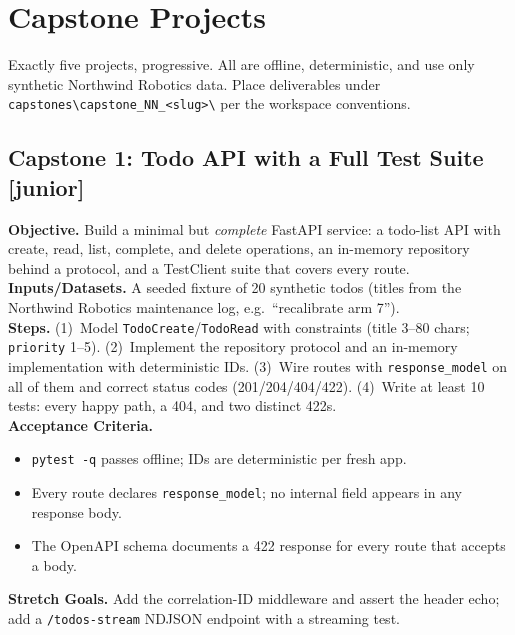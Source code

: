 \section{Capstone Projects}
\label{sec:ch6-capstones}

Exactly five projects, progressive. All are offline, deterministic, and use
only synthetic Northwind Robotics data. Place deliverables under
\texttt{capstones\textbackslash{}capstone\_NN\_<slug>\textbackslash{}} per the
workspace conventions.

\subsection{Capstone 1: Todo API with a Full Test Suite [junior]}
\textbf{Objective.} Build a minimal but \emph{complete} FastAPI service: a
todo-list API with create, read, list, complete, and delete operations, an
in-memory repository behind a protocol, and a TestClient suite that covers
every route.\\
\textbf{Inputs/Datasets.} A seeded fixture of 20 synthetic todos (titles from
the Northwind Robotics maintenance log, e.g.\ ``recalibrate arm 7'').\\
\textbf{Steps.} (1)~Model \texttt{TodoCreate}/\texttt{TodoRead} with
constraints (title 3--80 chars; \texttt{priority} 1--5). (2)~Implement the
repository protocol and an in-memory implementation with deterministic IDs.
(3)~Wire routes with \texttt{response\_model} on all of them and correct
status codes (201/204/404/422). (4)~Write at least 10 tests: every happy
path, a 404, and two distinct 422s.\\
\textbf{Acceptance Criteria.}
\begin{itemize}
  \item[$\square$] \texttt{pytest -q} passes offline; IDs are deterministic
        per fresh app.
  \item[$\square$] Every route declares \texttt{response\_model}; no internal
        field appears in any response body.
  \item[$\square$] The OpenAPI schema documents a 422 response for every
        route that accepts a body.
\end{itemize}
\textbf{Stretch Goals.} Add the correlation-ID middleware and assert the
header echo; add a \texttt{/todos-stream} NDJSON endpoint with a streaming
test.


